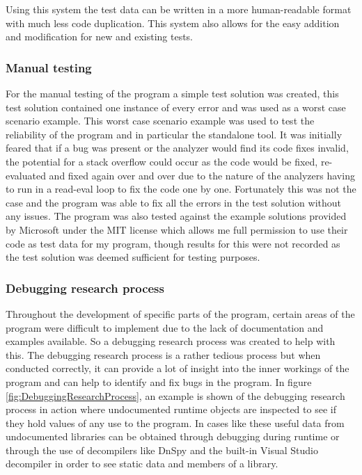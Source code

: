 Using this system the test data can be written in a more human-readable format with much less code duplication. This system also allows for the easy addition and modification for new and existing tests.

\subsubsection{Manual testing}
\label{sec:StandaloneToolTests}
For the manual testing of the program a simple test solution was created, this test solution contained one instance of every error and was used as a worst case scenario example. This worst case scenario example was used to test the reliability of the program and in particular the standalone tool. It was initially feared that if a bug was present or the analyzer would find its code fixes invalid, the potential for a stack overflow could occur as the code would be fixed, re-evaluated and fixed again over and over due to the nature of the analyzers having to run in a read-eval loop to fix the code one by one. Fortunately this was not the case and the program was able to fix all the errors in the test solution without any issues. The program was also tested against the example solutions provided by Microsoft under the MIT license which allows me full permission to use their code as test data for my program, though results for this were not recorded as the test solution was deemed sufficient for testing purposes.

\subsubsection{Debugging research process}
\label{sec:DebuggingResearchProcess}
Throughout the development of specific parts of the program, certain areas of the program were difficult to implement due to the lack of documentation and examples available. So a debugging research process was created to help with this. The debugging research process is a rather tedious process but when conducted correctly, it can provide a lot of insight into the inner workings of the program and can help to identify and fix bugs in the program. In figure \ref{fig:DebuggingResearchProcess}, an example is shown of the debugging research process in action where undocumented runtime objects are inspected to see if they hold values of any use to the program. In cases like these useful data from undocumented libraries can be obtained through debugging during runtime or through the use of decompilers like DnSpy and the built-in Visual Studio decompiler in order to see static data and members of a library.

